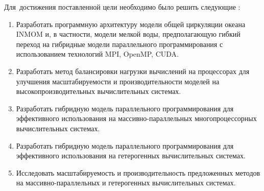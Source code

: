 Для~достижения поставленной цели необходимо было решить следующие {\tasks}:
\begin{enumerate}[beginpenalty=10000] %
    \item Разработать программную архитектуру модели общей циркуляции океана INMOM и, в частности,  модели мелкой воды, предполагающую гибкий переход на гибридные модели параллельного программирования с использованием технологий MPI, OpenMP, CUDA.
    \item Разработать метод балансировки нагрузки вычислений на процессорах для улучшения масштабируемости и производительности моделей на высокопроизводительных вычислительных системах.
    \item Разработать гибридную модель параллельного программирования для эффективного использования на массивно-параллельных многопроцессорных вычислительных системах.
    \item Разработать гибридную модель параллельного программирования для эффективного использования на гетерогенных вычислительных системах.
    \item Исследовать масштабируемость и производительность предложенных методов на массивно-параллельных и гетерогенных вычислительных системах. 
\end{enumerate}

